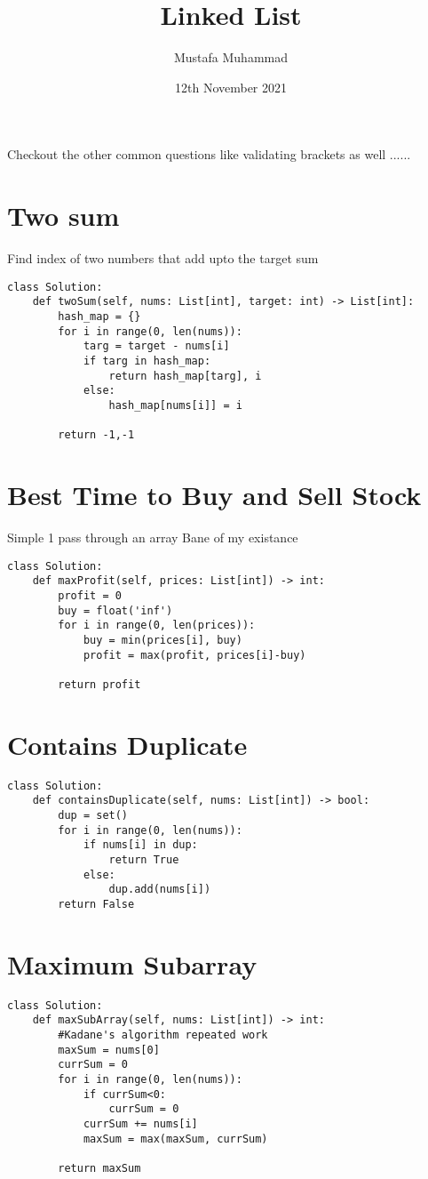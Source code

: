 \documentclass[24pt, a4]{article}
\title{Linked List}
\author{Mustafa Muhammad}
\date{12th November 2021}
\begin{document}
\maketitle

Checkout the other common questions like validating brackets as well ......
\section{Two sum}
Find index of two numbers that add upto the target sum
\begin{lstlisting}
class Solution:
    def twoSum(self, nums: List[int], target: int) -> List[int]:
        hash_map = {}
        for i in range(0, len(nums)):
            targ = target - nums[i]
            if targ in hash_map:
                return hash_map[targ], i
            else:
                hash_map[nums[i]] = i
                
        return -1,-1
\end{lstlisting}

\section{Best Time to Buy and Sell Stock}
Simple 1 pass through an array
Bane of my existance
\begin{lstlisting}
class Solution:
    def maxProfit(self, prices: List[int]) -> int:
        profit = 0
        buy = float('inf')
        for i in range(0, len(prices)):
            buy = min(prices[i], buy)
            profit = max(profit, prices[i]-buy)
            
        return profit
\end{lstlisting}
\section{Contains Duplicate}
\begin{lstlisting}
class Solution:
    def containsDuplicate(self, nums: List[int]) -> bool:
        dup = set()
        for i in range(0, len(nums)):
            if nums[i] in dup:
                return True
            else:
                dup.add(nums[i])
        return False
\end{lstlisting}
\section{Maximum Subarray}
\begin{lstlisting}
class Solution:
    def maxSubArray(self, nums: List[int]) -> int:
        #Kadane's algorithm repeated work
        maxSum = nums[0]
        currSum = 0
        for i in range(0, len(nums)):
            if currSum<0:
                currSum = 0
            currSum += nums[i]
            maxSum = max(maxSum, currSum)
        
        return maxSum
\end{lstlisting}
\end{document}
